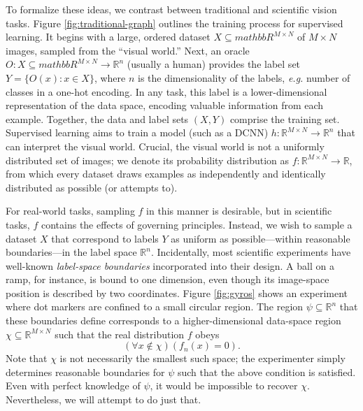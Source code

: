 \documentclass[10pt, journal]{IEEEtran}
\begin{document}
To formalize these ideas, we contrast between traditional and scientific vision
tasks. Figure \ref{fig:traditional-graph} outlines the training process for
supervised learning. It begins with a large, ordered dataset
$X \subseteq mathbb{R}^{M \times N}$ of $M \times N$ images, sampled from the
``visual world.'' Next, an oracle
$O : X \subseteq mathbb{R}^{M \times N} \rightarrow \mathbb{R}^n$ (usually a
human) provides the label set $Y = \{O(x) : x \in X\}$, where $n$ is the
dimensionality of the labels, \emph{e.g.} number of classes in a one-hot
encoding. In any task, this label is a lower-dimensional representation of
the data space, encoding valuable information from each example. Together, the
data and label sets $(X,Y)$ comprise the training set. Supervised learning
aims to train a model (such as a DCNN)
$h : \mathbb{R}^{M\times N} \rightarrow \mathbb{R}^n$ that can interpret the
visual world. Crucial, the visual world is not a uniformly distributed set of
images; we denote its probability distribution as
$f : \mathbb{R}^{M\times N} \rightarrow \mathbb{R}$, from which every dataset
draws examples as independently and identically distributed as possible (or
attempts to).

For real-world tasks, sampling $f$ in this manner is desirable, but in
scientific tasks, $f$ contains the effects of governing principles. Instead, we
wish to sample a dataset $X$ that correspond to labels $Y$ as uniform as
possible---within reasonable boundaries---in the label space
$\mathbb{R}^n$. Incidentally, most scientific experiments have well-known
\emph{label-space boundaries} incorporated into their design. A ball on a
ramp, for instance, is bound to one dimension, even though its image-space
position is described by two coordinates. Figure \ref{fig:gyros} shows an
experiment where dot markers are confined to a small circular region. The region
$\psi \subseteq \mathbb{R}^n$ that these boundaries define corresponds to a
higher-dimensional data-space region $\chi \subseteq \mathbb{R}^{M\times N}$
such that the real distribution $f$ obeys
\[ (\forall x \not\in \chi)(f_n(x) = 0). \] Note that $\chi$ is not necessarily
the smallest such space; the experimenter simply determines reasonable
boundaries for $\psi$ such that the above condition is satisfied. Even with
perfect knowledge of $\psi$, it would be impossible to recover
$\chi$. Nevertheless, we will attempt to do just that.
\end{document}

